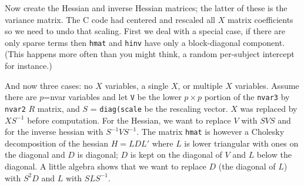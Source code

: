 \documentclass{article}
\begin{document}
Now create the Hessian and inverse Hessian matrices; the latter of
these is the variance matrix.  
The C code had centered and rescaled all $X$ matrix coefficients
so we need to undo that scaling. 
First we deal with a special case, if there are only sparse terms
then \Verb!hmat! and \Verb?hinv? have only a block-diagonal component.
(This happens more often than you might think, a random per-subject
intercept for instance.)
And now three cases: no $X$ variables, a single $X$, or multiple $X$
variables.
Assume there are $p$=nvar variables and let \Verb!V! be the lower $p \times p$
portion of the \Verb!nvar3! by \Verb?nvar2? $R$ matrix,
and $S$ = \Verb!diag(scale!
be the rescaling vector.
$X$ was replaced by $X S^{-1}$ before computation.
For the Hessian, we want to replace $V$ with $SVS$ and for the
inverse hessian with $S^{-1}V S^{-1}$.
The matrix \Verb!hmat! is however a Cholesky decomposition of the
hessian $H=LDL'$ where $L$ is lower triangular with ones on the     %
diagonal and $D$ is diagonal; $D$ is kept on the diagonal of $V$ and
$L$ below the diagonal.
A little algebra shows that we want to replace $D$ (the diagonal of $L$)
with $S^2D$ and $L$ with $SLS^{-1}$.
\end{document}
